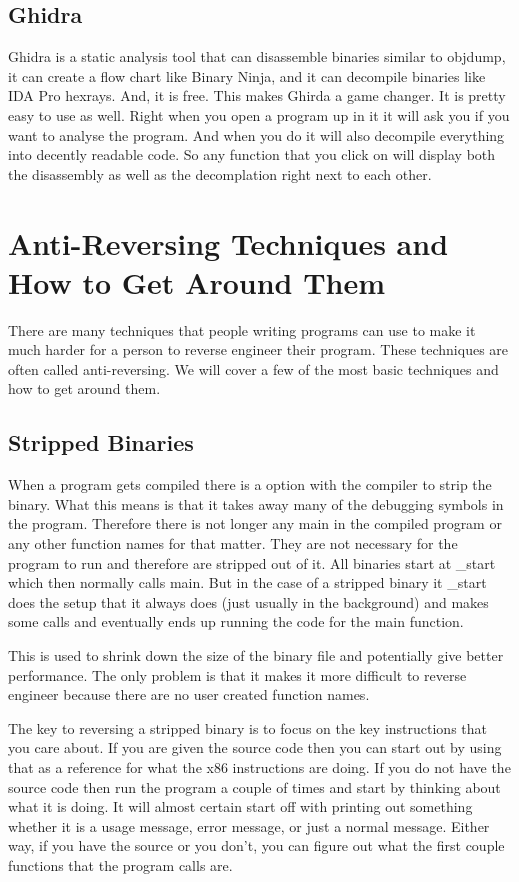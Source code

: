 \documentclass{report}
\begin{document}
\section{Ghidra}
Ghidra is a static analysis tool that can disassemble binaries similar to objdump, it can create a 
flow chart like Binary Ninja, and it can decompile binaries like IDA Pro hexrays.  And, it is free.
This makes Ghirda a game changer.  It is pretty easy to use as well.  Right when you open a program
up in it it will ask you if you want to analyse the program.  And when you do it will also decompile
everything into decently readable code.  So any function that you click on will display both
the disassembly as well as the decomplation right next to each other.


\chapter{Anti-Reversing Techniques and How to Get Around Them}
There are many techniques that people writing programs can use to make it much harder for a person to reverse engineer their program.  These techniques are often called anti-reversing.  We will cover a few of the most basic techniques and how to get around them.

\section{Stripped Binaries}
When a program gets compiled there is a option with the compiler to strip the binary.
What this means is that it takes away many of the debugging symbols in the program.
Therefore there is not longer any main in the compiled program or any other function
names for that matter.  They are not necessary for the program to run and therefore 
are stripped out of it.  All binaries start at \_start which then normally calls 
main.  But in the case of a stripped binary it \_start does the setup that it always 
does (just usually in the background) and makes some calls and eventually ends up 
running the code for the main function.

This is used to shrink down the size of the binary file and potentially give better
performance.  The only problem is that it makes it more difficult to reverse engineer because
there are no user created function names.

The key to reversing a stripped binary is to focus on the key instructions that you 
care about.  If you are given the source code then you can start out by using that
as a reference for what the x86 instructions are doing.  If you do not have the source
code then run the program a couple of times and start by thinking about what it is doing.
It will almost certain start off with printing out something whether it is a usage 
message, error message, or just a normal message.  Either way, if you have the source
or you don't, you can figure out what the first couple functions that the program calls
are.
\end{document}
